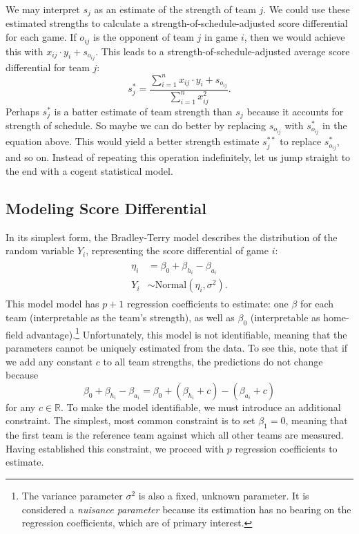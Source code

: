 \documentclass{article}
\begin{document}
  We may interpret $s_j$ as an estimate of the strength of team $j$. We could use these estimated strengths to calculate a strength-of-schedule-adjusted score differential for each game. If $o_{ij}$ is the opponent of team $j$ in game $i$, then we would achieve this with $x_{ij} \cdot y_i + s_{o_{ij}}$. This leads to a strength-of-schedule-adjusted average score differential for team $j$:
  \begin{equation}
    \label{eqn-adjusted-point-differential}
    s^*_j = \frac{
      \sum_{i=1}^n x_{ij} \cdot y_i + s_{o_{ij}}
    }{
      \sum_{i=1}^n x_{ij}^2
    }.
  \end{equation}
  Perhaps $s^*_j$ is a batter estimate of team strength than $s_j$ because it accounts for strength of schedule. So maybe we can do better by replacing $s_{o_{ij}}$ with $s^*_{o_{ij}}$ in the equation above. This would yield a better strength estimate $s^{**}_j$ to replace $s^*_{o_{ij}}$, and so on. Instead of repeating this operation indefinitely, let us jump straight to the end with a cogent statistical model.

  \subsection{\sc Modeling Score Differential}

  In its simplest form, the Bradley-Terry model describes the distribution of the random variable $Y_i$, representing the score differential of game $i$:
  \begin{align}
    \label{eqn-linear-regression}
    \begin{split}
      \eta_i &= \beta_0 + \beta_{h_i} - \beta_{a_i}\\
      Y_i &\sim \mbox{Normal}(\eta_i, \sigma^2).
    \end{split}
  \end{align}
  This model model has $p + 1$ regression coefficients to estimate: one $\beta$ for each team (interpretable as the team's strength), as well as $\beta_0$ (interpretable as home-field advantage).\footnote{The variance parameter $\sigma^2$ is also a fixed, unknown parameter. It is considered a {\it nuisance parameter} because its estimation has no bearing on the regression coefficients, which are of primary interest.} Unfortunately, this model is not identifiable, meaning that the parameters cannot be uniquely estimated from the data. To see this, note that if we add any constant $c$ to all team strengths, the predictions do not change because
  \begin{equation*}
    \beta_0 + \beta_{h_i} - \beta_{a_i} = \beta_0 + (\beta_{h_i} + c) - (\beta_{a_i} + c)
  \end{equation*}
  for any $c \in \mathbb{R}$. To make the model identifiable, we must introduce an additional constraint. The simplest, most common constraint is to set $\beta_1 = 0$, meaning that the first team is the reference team against which all other teams are measured. Having established this constraint, we proceed with $p$ regression coefficients to estimate.
  
\end{document}
